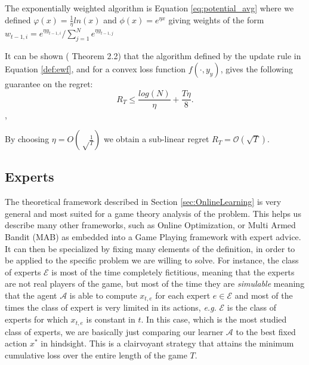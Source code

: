 \begin{definition}\label{def:ewf}
	The exponentially weighted algorithm is Equation \eqref{eq:potential_avg} where we defined $\varphi(x)=\frac{1}{\eta}ln(x)$ and $\phi(x)=e^{\eta x}$ giving weights of the form $w_{t-1,i}=e^{\eta y_{t-1,i}}/\sum\limits_{j=1}^Ne^{\eta y_{t-1,j}}$
\end{definition}

It can be shown (\cite{cesa2006prediction} Theorem 2.2) that the algorithm defined by the update rule in Equation \eqref{def:ewf}, and for a convex loss function $f(\cdot,y_y)$, gives the following guarantee on the regret:
\begin{equation}\label{eq:regret_ewf}
R_T\le \frac{log(N)}{\eta}+\frac{T\eta}{8}.
\end{equation},

By choosing $\eta=O\left(\sqrt\frac{1}{T}\right)$ we obtain a sub-linear regret $R_T=\mathcal O(\sqrt T)$. %



\subsection{Experts}
The theoretical framework described in Section \ref{sec:OnlineLearning} is very general and most suited for a game theory analysis of the problem. This helps us describe many other frameworks, such as Online Optimization, or Multi Armed Bandit (MAB) as embedded into a Game Playing framework with expert advice. It can then be specialized by fixing many elements of the definition, in order to be applied to the specific problem we are willing to solve.
For instance, the class of experts $\mathcal E$ is most of the time completely fictitious, meaning that the experts are not real players of the game, but most of the time they are \emph{simulable} meaning that the agent $\mathcal A$ is able to compute $x_{t,e}$ for each expert $e\in\mathcal E$ and most of the times the class of expert is very limited in its actions, \emph{e.g.} $\mathcal E$ is the class of experts for which $x_{t,e}$ is constant in $t$. In this case, which is the most studied class of experts, we are basically just comparing our learner $\mathcal A$ to the best fixed action $x^*$ in hindsight. This is a clairvoyant strategy that attains the minimum cumulative loss over the entire length of the game $T$.

